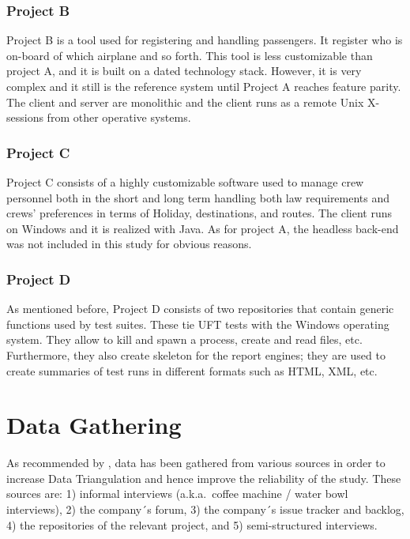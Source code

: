 \subsubsection{Project B}
Project B is a tool used for registering and handling passengers. It register who is on-board of which airplane and so forth. This tool is less customizable than project A, and it is built on a dated technology stack. However, it is very complex and it still is the reference system until Project A reaches feature parity. The client and server are monolithic and the client runs as a remote Unix X-sessions from other operative systems.

\subsubsection{Project C}
Project C consists of a highly customizable software used to manage crew personnel both in the short and long term handling both law requirements and crews' preferences in terms of Holiday, destinations, and routes. The client runs on Windows and it is realized with Java. As for project A, the headless back-end was not included in this study for obvious reasons.

\subsubsection{Project D}
As mentioned before, Project D consists of two repositories that contain generic functions used by test suites. These tie UFT tests with the Windows operating system. They allow to kill and spawn a process, create and read files, etc. Furthermore, they also create skeleton for the report engines; they are used to create summaries of test runs in different formats such as HTML, XML, etc.

%
%
%
%

%
%
%
%
\section{Data Gathering}
As recommended by \cite{case_study_guide,case_study_software_engineering}, data has been gathered from various sources in order to increase Data Triangulation and hence improve the reliability of the study. These sources are: 1) informal interviews (a.k.a.\ coffee machine / water bowl interviews), 2) the company´s forum, 3) the company´s issue tracker and backlog, 4) the repositories of the relevant project, and 5) semi-structured interviews.

